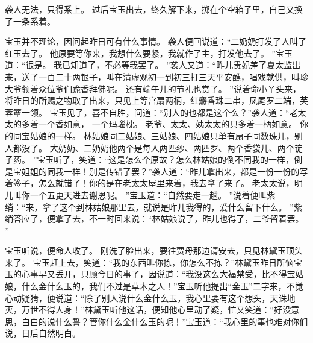 袭人无法，只得系上。
过后宝玉出去，终久解下来，掷在个空箱子里，自己又换了一条系着。
\par
宝玉并不理论，因问起昨日可有什么事情。
袭人便回说道：“二奶奶打发了人叫了红玉去了。
他原要等你来，我想什么要紧，我就作了主，打发他去了。
”宝玉道：“很是。
我已知道了，不必等我罢了。
”袭人又道：“昨儿贵妃差了夏太监出来，送了一百二十两银子，叫在清虚观初一到初三打三天平安醮，唱戏献供，叫珍大爷领着众位爷们跪香拜佛呢。
还有端午儿的节礼也赏了。
”说着命小丫头来，将昨日的所赐之物取了出来，只见上等宫扇两柄，红麝香珠二串，凤尾罗二端，芙蓉簟一领。
宝玉见了，喜不自胜，问道：“别人的也都是这个么？”袭人道：“老太太的多着一个香如意，
一个玛瑙枕。
老爷、太太、姨太太的只多着一柄如意。
你的同宝姑娘的一样。
林姑娘同二姑娘、三姑娘、四姑娘只单有扇子同数珠儿，别人都没了。
大奶奶、二奶奶他两个是每人两匹纱、两匹罗、两个香袋儿、两个锭子药。
”宝玉听了，笑道：“这是怎么个原故？怎么林姑娘的倒不同我的一样，倒是宝姐姐的同我一样！别是传错了罢？”袭人道：“昨儿拿出来，都是一份一份的写着签子，怎么就错了！你的是在老太太屋里来着，我去拿了来了。
老太太说，明儿叫你一个五更天进去谢恩呢。
”宝玉道：“自然要走一趟。
”说着便叫紫绡：“来，拿了这个到林姑娘那里去，就说是昨儿我得的，爱什么留下什么。
”紫绡答应了，便拿了去，不一时回来说：“林姑娘说了，昨儿也得了，二爷留着罢。
”\par
宝玉听说，便命人收了。
刚洗了脸出来，要往贾母那边请安去，只见林黛玉顶头来了。
宝玉赶上去，笑道：“我的东西叫你拣，你怎么不拣？”林黛玉昨日所恼宝玉的心事早又丢开，只顾今日的事了，因说道：“我没这么大福禁受，比不得宝姑娘，什么金什么玉的，我们不过是草木之人！”宝玉听他提出“金玉”二字来，不觉心动疑猜，便说道：“除了别人说什么金什么玉，我心里要有这个想头，天诛地灭，万世不得人身！”林黛玉听他这话，便知他心里动了疑，忙又笑道：“好没意思，白白的说什么誓？管你什么金什么玉的呢！”宝玉道：“我心里的事也难对你们说，日后自然明白。
